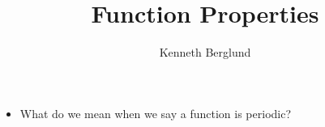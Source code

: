 \documentclass[nooutcomes]{ximera}
\author{Kenneth Berglund}
\title{Function Properties}
\begin{document}
\licenseAPCSZCSCC
\begin{abstract}
  
\end{abstract}
\maketitle



\begin{motivatingQuestions}\begin{itemize}
\item What do we mean when we say a function is periodic?
\end{itemize}\end{motivatingQuestions}



%
%
%
%
\end{document}
